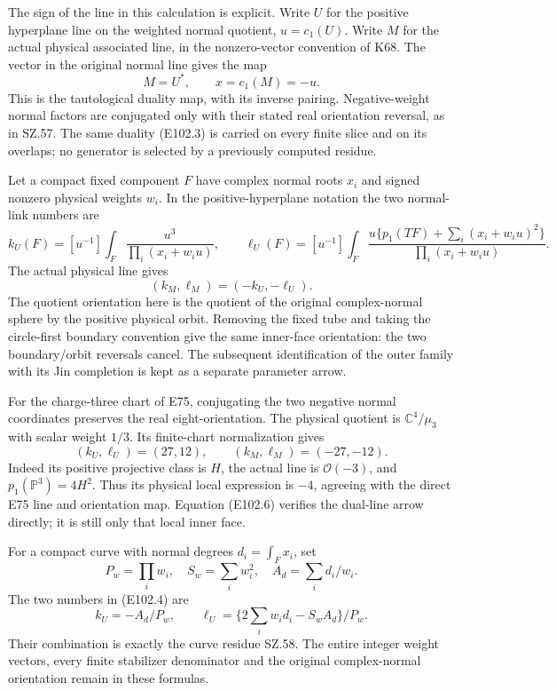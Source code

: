 The sign of the line in this calculation is explicit. Write \(U\) for the positive hyperplane line on the weighted normal quotient, \(u=c_1(U)\). Write \(M\) for the actual physical associated line, in the nonzero-vector convention of K68. The vector in the original normal line gives the map
\[
                         M=U^*,\qquad x=c_1(M)=-u.
 \tag{E102.3}
\]
This is the tautological duality map, with its inverse pairing. Negative-weight normal factors are conjugated only with their stated real orientation reversal, as in SZ.57. The same duality (E102.3) is carried on every finite slice and on its overlaps; no generator is selected by a previously computed residue.

Let a compact fixed component \(F\) have complex normal roots \(x_i\) and signed nonzero physical weights \(w_i\). In the positive-hyperplane notation the two normal-link numbers are
\[
 k_U(F)=[u^{-1}]\int_F\frac{u^3}{\prod_i(x_i+w_i u)},\qquad
 \ell_U(F)=[u^{-1}]\int_F
 \frac{u\{p_1(TF)+\sum_i(x_i+w_i u)^2\}}
      {\prod_i(x_i+w_i u)}.
 \tag{E102.4}
\]
The actual physical line gives
\[
                       (k_M,\ell_M)=(-k_U,-\ell_U).
 \tag{E102.5}
\]
The quotient orientation here is the quotient of the original complex-normal sphere by the positive physical orbit. Removing the fixed tube and taking the circle-first boundary convention give the same inner-face orientation: the two boundary/orbit reversals cancel. The subsequent identification of the outer family with its Jin completion is kept as a separate parameter arrow.

For the charge-three chart of E75, conjugating the two negative normal coordinates preserves the real eight-orientation. The physical quotient is \(\mathbb C^4/\mu_3\) with scalar weight \(1/3\). Its finite-chart normalization gives
\[
 (k_U,\ell_U)=(27,12),\qquad
 (k_M,\ell_M)=(-27,-12).
 \tag{E102.6}
\]
Indeed its positive projective class is \(H\), the actual line is \(\mathcal O(-3)\), and \(p_1(\mathbb P^3)=4H^2\). Thus its physical local expression is \(-4\), agreeing with the direct E75 line and orientation map. Equation (E102.6) verifies the dual-line arrow directly; it is still only that local inner face.

For a compact curve with normal degrees \(d_i=\int_Fx_i\), set
\[
 P_w=\prod_iw_i,\quad S_w=\sum_iw_i^2,\quad A_d=\sum_i d_i/w_i.
\]
The two numbers in (E102.4) are
\[
 k_U=-A_d/P_w,\qquad
 \ell_U=\{2\sum_iw_id_i-S_wA_d\}/P_w.
 \tag{E102.7}
\]
Their combination is exactly the curve residue SZ.58. The entire integer weight vectors, every finite stabilizer denominator and the original complex-normal orientation remain in these formulas.

